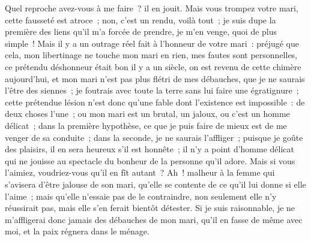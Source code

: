 \documentclass[french,twoside]{book} %
\begin{document}
Quel reproche avez-vous à me faire ? il en jouit. Mais vous trompez votre mari, cette fausseté est atroce ; non, c’est un rendu, voilà tout ; je suis dupe la première des liens qu’il m’a forcée de prendre, je m’en venge, quoi de plus simple ! Mais il y a un outrage réel fait à l’honneur de votre mari : préjugé que cela, mon libertinage ne touche mon mari en rien, mes fautes sont personnelles, ce prétendu déshonneur était bon il y a un siècle, on est revenu de cette chimère aujourd’hui, et mon mari n’est pas plus flétri de mes débauches, que je ne saurais l’être des siennes ; je foutrais avec toute la terre sans lui faire une égratignure ; cette prétendue lésion n’est donc qu’une fable dont l’existence est impossible : de deux choses l’une ; ou mon mari est un brutal, un jaloux, ou c’est un homme délicat ; dans la première hypothèse, ce que je puis faire de mieux est de me venger de sa conduite ; dans la seconde, je ne saurais l’affliger ; puisque je goûte des plaisirs, il en sera heureux s’il est honnête ; il n’y a point d’homme délicat qui ne jouisse au spectacle du bonheur de la personne qu’il adore. Mais si vous l’aimiez, voudriez-vous qu’il en fît autant ? Ah ! malheur à la femme qui s’avisera d’être jalouse de son mari, qu’elle se contente de ce qu’il lui donne si elle l’aime ; mais qu’elle n’essaie pas de le contraindre, non seulement elle n’y réussirait pas, mais elle s’en ferait bientôt détester. Si je suis raisonnable, je ne m’affligerai donc jamais des débauches de mon mari, qu’il en fasse de même avec moi, et la paix régnera dans le ménage.\par
\end{document}
